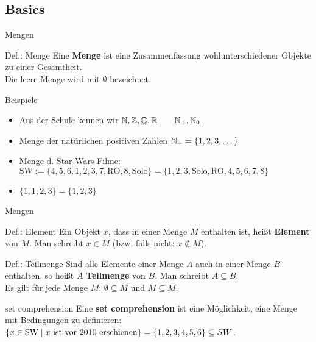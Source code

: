 \subsection{Basics}
	\begin{frame}{Mengen}
		\begin{block}{Def.: Menge}
			Eine \textbf{Menge} ist eine Zusammenfassung wohlunterschiedener Objekte zu einer Gesamtheit.\\
			Die leere Menge wird mit $\emptyset$ bezeichnet.\\
		\end{block}
		\pause
		\begin{exampleblock}{Beispiele}
			\begin{itemize}
				\item Aus der Schule kennen wir \qquad $\mathbb{N}, \mathbb{Z}, \mathbb{Q}, \mathbb{R} \qquad \mathbb{N}_+, \mathbb{N}_0$.
				\item Menge der natürlichen positiven Zahlen $\mathbb{N}_+ = \{1,2,3,\dots\}$
				\item Menge d. Star-Wars-Filme: $\text{SW}:=\{4,5,6,1,2,3,7,\text{RO},8,\text{Solo}\} = \{1,2,3,\text{Solo},\text{RO},4,5,6,7,8\}$
				\item $\{1,1,2,3\} = \{1,2,3\}$
			\end{itemize}
		\end{exampleblock}
	\end{frame}

	\begin{frame}{Mengen}
		\begin{block}{Def.: Element}
			Ein Objekt $x$, dass in einer Menge $M$ enthalten ist, heißt \textbf{Element} von $M$. Man schreibt $x \in M$ (bzw. falls nicht: $x \notin M$).			
		\end{block}

		\begin{block}{Def.: Teilmenge}
			Sind alle Elemente einer Menge $A$ auch in einer Menge $B$ enthalten, so heißt $A$ \textbf{Teilmenge} von $B$. Man schreibt $A \subseteq B$.\\
			Es gilt für jede Menge $M$: $\emptyset \subseteq M$ und $M \subseteq M$.
		\end{block}
		\pause
		\begin{block}{set comprehension}
			Eine \textbf{set comprehension} ist eine Möglichkeit, eine Menge mit Bedingungen zu definieren:\\
			$\left\{ x \in \text{SW} \mid x \text{ ist vor 2010 erschienen} \right\} = \left\{ 1,2,3,4,5,6 \right\} \subseteq SW$.
		\end{block}
	\end{frame}

